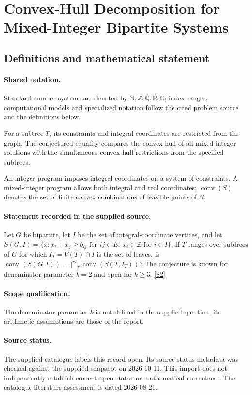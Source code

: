\documentclass[11pt]{article}
\newcommand{\sref}[2]{\hyperlink{source:#1:#2}{[S#2]}}
\begin{document}
\section{Convex-Hull Decomposition for Mixed-Integer Bipartite Systems}\label{statement}

\subsection{Definitions and mathematical statement}

\paragraph{Shared notation.}Standard number systems are denoted by $\mathbb N,\mathbb Z,\mathbb Q,\mathbb R,\mathbb C$; index ranges, computational models and specialized notation follow the cited problem source and the definitions below.


For a subtree $T$, its constraints and integral coordinates are restricted from the graph. The conjectured equality compares the convex hull of all mixed-integer solutions with the simultaneous convex-hull restrictions from the specified subtrees.

An integer program imposes integral coordinates on a system of constraints. A mixed-integer program allows both integral and real coordinates; $\operatorname{conv}(S)$ denotes the set of finite convex combinations of feasible points of $S$.
\paragraph{Statement recorded in the supplied source.}
Let $G$ be bipartite, let $I$ be the set of integral-coordinate vertices, and let $S(G,I)=\{x:x_i+x_j\geq b_{ij}\text{ for }ij\in E,\ x_i\in\mathbb{Z}\text{ for }i\in I\}$. If $T$ ranges over subtrees of $G$ for which $I_T=V(T)\cap I$ is the set of leaves, is $\operatorname{conv}(S(G,I))=\bigcap_T\operatorname{conv}(S(T,I_T))$? The conjecture is known for denominator parameter $k=2$ and open for $k\geq3$. \sref{statement}{2}
\paragraph{Scope qualification.}
The denominator parameter $k$ is not defined in the supplied question; its arithmetic assumptions are those of the report.
\paragraph{Source status.}
The supplied catalogue labels this record open. Its source-status metadata was checked against the supplied snapshot on 2026-10-11. This import does not independently establish current open status or mathematical correctness. The catalogue literature assessment is dated 2026-08-21.
\end{document}
